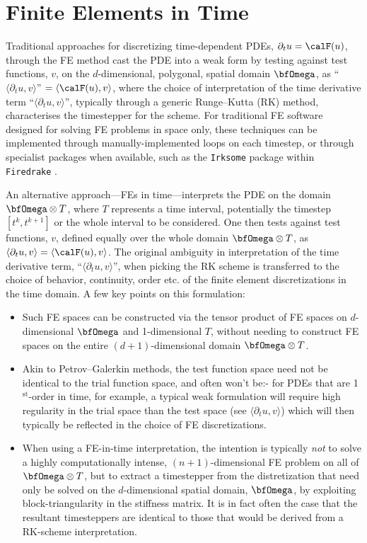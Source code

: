 \chapter{Finite Elements in Time}\label{cha:finite elements in time}

    Traditional approaches for discretizing time-dependent PDEs, $\partial_{t}u  =  \calF(u)$, through the FE method cast the PDE into a weak form by testing against test functions, $v$, on the $d$-dimensional, polygonal, spatial domain $\bfOmega$, as ``$\langle\partial_{t}u, v\rangle$''  $=  \langle\calF(u), v\rangle$, where the choice of interpretation of the time derivative term ``$\langle\partial_{t}u, v\rangle$'', typically through a generic Runge–Kutta (RK) method, characterises the timestepper for the scheme. For traditional FE software designed for solving FE problems in space only, these techniques can be implemented through manually-implemented loops on each timestep, or through specialist packages when available, such as the \texttt{Irksome} package within \texttt{Firedrake} \BA{[Ref]}.

    An alternative approach—FEs in time—interprets the PDE on the domain $\bfOmega\otimes T$, where $T$ represents a time interval, potentially the timestep $\left[t^{k}, t^{k + 1}\right]$ or the whole interval to be considered. One then tests against test functions, $v$, defined equally over the whole domain $\bfOmega\otimes T$, as $\langle\partial_{t}u, v\rangle  =  \langle\calF(u), v\rangle$. The original ambiguity in interpretation of the time derivative term, ``$\langle\partial_{t}u, v\rangle$'', when picking the RK scheme is transferred to the choice of behavior, continuity, order etc. of the finite element discretizations in the time domain. A few key points on this formulation:
    \begin{itemize}
        \item  Such FE spaces can be constructed via the tensor product of FE spaces on $d$-dimensional $\bfOmega$ and 1-dimensional $T$, without needing to construct FE spaces on the entire $(d + 1)$-dimensional domain $\bfOmega\otimes T$.
        \item  Akin to Petrov–Galerkin methods, the test function space need not be identical to the trial function space, and often won't be:- for PDEs that are 1$^{\text{st}}$-order in time, for example, a typical weak formulation will require high regularity in the trial space than the test space (see $\langle\partial_{t}u, v\rangle$) which will then typically be reflected in the choice of FE discretizations.
        \item  When using a FE-in-time interpretation, the intention is typically \emph{not} to solve a highly computationally intense, $(n + 1)$-dimensional FE problem on all of $\bfOmega\otimes T$, but to extract a timestepper from the distretization that need only be solved on the $d$-dimensional spatial domain, $\bfOmega$, by exploiting block-triangularity in the stiffness  matrix. It is in fact often the case that the resultant timesteppers are identical to those that would be derived from a RK-scheme interpretation.
    \end{itemize}

